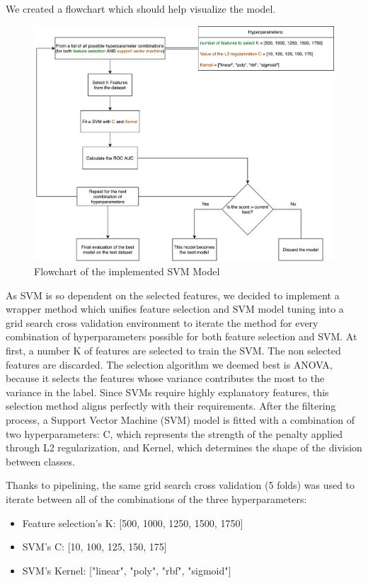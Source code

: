 \documentclass{article}
\begin{document}
We created a flowchart which should help visualize the model.

\begin{figure}[h]
	\centering
	\includegraphics[width=1.0\textwidth]{FlowChart.png}
	 \vspace{0em}
	\caption{Flowchart of the implemented SVM Model}
\end{figure}

As SVM is so dependent on the selected features, we decided to implement a wrapper method which unifies feature selection and SVM model tuning into a grid search cross validation environment to iterate the method for every combination of hyperparameters possible for both feature selection and SVM. At first, a number K of features are selected to train the SVM. The non selected features are discarded. The selection algorithm we deemed best is ANOVA, because it selects the features whose variance contributes the most to the variance in the label. Since SVMs require highly explanatory features, this selection method aligns perfectly with their requirements. After the filtering process, a Support Vector Machine (SVM) model is fitted with a combination of two hyperparameters: C, which represents the strength of the penalty applied through L2 regularization, and Kernel, which determines the shape of the division between classes.

 \newpage Thanks to pipelining, the same grid search cross validation (5 folds) was used to iterate between all of the combinations of the three hyperparameters:
 
\begin{itemize}
  \item Feature selection's K: [500, 1000, 1250, 1500, 1750]
  \item SVM's C: [10, 100, 125, 150, 175]
  \item SVM's Kernel: ["linear", "poly", "rbf", "sigmoid"]
\end{itemize}
\end{document}

